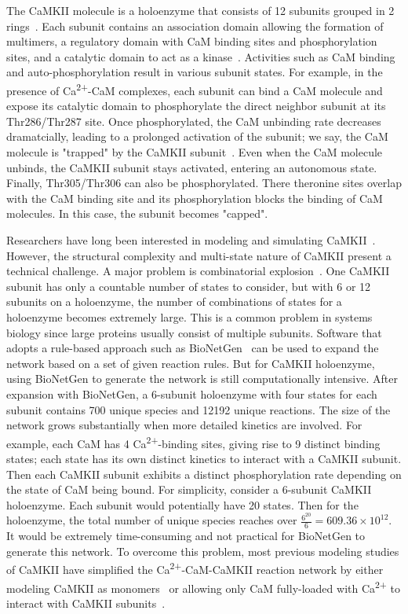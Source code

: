 \documentclass[10pt,letterpaper]{article}
\begin{document}
The CaMKII molecule is a holoenzyme that consists of 12 subunits grouped in 2 rings~\cite{}. Each subunit contains an association domain allowing the formation of multimers, a regulatory domain with CaM binding sites and phosphorylation sites, and a catalytic domain to act as a kinase~\cite{}. Activities such as CaM binding and auto-phosphorylation result in various subunit states. For example, in the presence of Ca\textsuperscript{2+}-CaM complexes, each subunit can bind a CaM molecule and expose its catalytic domain to phosphorylate the direct neighbor subunit at its Thr286/Thr287 site. Once phosphorylated, the CaM unbinding rate decreases dramatcially, leading to a prolonged activation of the subunit; we say, the CaM molecule is "trapped" by the CaMKII subunit~\cite{Meyer:1992dp}. Even when the CaM molecule unbinds, the CaMKII subunit stays activated, entering an autonomous state. Finally, Thr305/Thr306 can also be phosphorylated. There theronine sites overlap with the CaM binding site and its phosphorylation blocks the binding of CaM molecules. In this case, the subunit becomes "capped". 

Researchers have long been interested in modeling and simulating CaMKII~\cite{Zhabotinsky:2000fp,Holmes:2000uk,Kubota:2001ul,Dupont:2003vq,Bhalla:2004cu,Lucic:2008gt,Zeng:2010bq,Pepke:2010ju,Michalski:2012ds}. However, the structural complexity and multi-state nature of CaMKII present a technical challenge. A major problem is combinatorial explosion~\cite{Stefan:2014gl}. One CaMKII subunit has only a countable number of states to consider, but with 6 or 12 subunits on a holoenzyme, the number of combinations of states for a holoenzyme becomes extremely large. This is a common problem in systems biology since large proteins usually consist of multiple subunits. Software that adopts a rule-based approach such as BioNetGen~\cite{Hlavacek:2006iq} can be used to expand the network based on a set of given reaction rules. But for CaMKII holoenzyme, using BioNetGen to generate the network is still computationally intensive. After expansion with BioNetGen, a 6-subunit holoenzyme with four states for each subunit contains 700 unique species and 12192 unique reactions. The size of the network grows substantially when more detailed kinetics are involved. For example, each CaM has 4 Ca\textsuperscript{2+}-binding sites, giving rise to 9 distinct binding states; each state has its own distinct kinetics to interact with a CaMKII subunit. Then each CaMKII subunit exhibits a distinct phosphorylation rate depending on the state of CaM being bound. For simplicity, consider a 6-subunit CaMKII holoenzyme. Each subunit would potentially have 20 states. Then for the holoenzyme, the total number of unique species reaches over $\frac{6^{20}}{6}=609.36\times10^{12}$. It would be extremely time-consuming and not practical for BioNetGen to generate this network. To overcome this problem, most previous modeling studies of CaMKII have simplified the Ca\textsuperscript{2+}-CaM-CaMKII reaction network by either modeling CaMKII as monomers~\cite{Bhalla:2004cu,Pepke:2010ju} or allowing only CaM fully-loaded with Ca\textsuperscript{2+} to interact with CaMKII subunits~\cite{Zhabotinsky:2000fp,Kubota:2001ul,Dupont:2003vq,Michalski:2012ds}.
\end{document}
